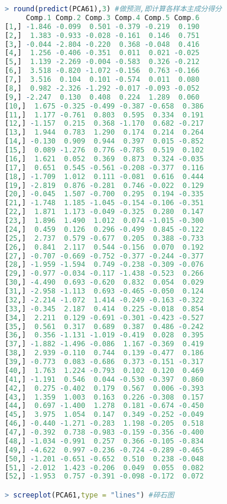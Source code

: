 \documentclass[11pt,a4paper,oneside]{book}
\begin{document}
\begin{lstlisting}[language=r]
> round(predict(PCA61),3) #做预测,即计算各样本主成分得分
     Comp.1 Comp.2 Comp.3 Comp.4 Comp.5 Comp.6
[1,] -1.846 -0.099  0.501 -0.379 -0.219  0.190
[2,]  1.383 -0.933 -0.028 -0.161  0.146  0.751
[3,] -0.044 -2.804 -0.220  0.368 -0.048  0.416
[4,]  1.256 -0.406 -0.351  0.011  0.021 -0.025
[5,]  1.139 -2.269 -0.004 -0.583  0.326 -0.212
[6,]  3.518 -0.820 -1.072 -0.156  0.763 -0.166
[7,]  3.516  0.104  0.101 -0.574  0.011  0.080
[8,]  0.982 -2.326 -1.292 -0.017 -0.093 -0.052
[9,] -2.247  0.130  0.408  0.224  1.289  0.060
[10,]  1.675 -0.325 -0.499 -0.387 -0.658  0.386
[11,]  1.177 -0.761  0.803  0.595  0.334  0.191
[12,] -1.157  0.215  0.368 -1.170  0.682 -0.217
[13,]  1.944  0.783  1.290  0.174  0.214  0.264
[14,] -0.130  0.909  0.944  0.397  0.015 -0.852
[15,]  0.089 -1.276  0.776 -0.785  0.519  0.102
[16,]  1.621  0.052  0.369  0.873  0.324 -0.035
[17,]  0.651  0.545 -0.561 -0.208 -0.377  0.116
[18,] -1.709  1.012  0.111 -0.081  0.616  0.444
[19,] -2.819  0.876 -0.281  0.746 -0.022  0.129
[20,] -0.045  1.507 -0.700  0.295  0.194 -0.335
[21,] -1.748  1.185 -1.045 -0.154 -0.106 -0.351
[22,]  1.871  1.173 -0.049 -0.325  0.280  0.147
[23,]  1.896  1.490  1.012  0.074 -1.015 -0.300
[24,]  0.459  0.126  0.296 -0.499  0.845 -0.122
[25,]  2.737  0.579 -0.677  0.205  0.388 -0.733
[26,]  0.841  2.117  0.544 -0.156  0.070  0.192
[27,] -0.707 -0.669 -0.752 -0.377 -0.244 -0.377
[28,] -1.959 -1.594  0.749 -0.238 -0.309 -0.076
[29,] -0.977 -0.034 -0.117 -1.438 -0.523  0.266
[30,] -4.490  0.693 -0.620  0.832  0.054  0.029
[31,] -2.958 -1.113  0.693 -0.465 -0.050  0.124
[32,] -2.214 -1.072  1.414 -0.249 -0.163 -0.322
[33,] -0.345  2.187  0.414  0.225 -0.018  0.854
[34,]  2.211  0.129 -0.691 -0.301 -0.423 -0.527
[35,]  0.561  0.317  0.689  0.387  0.486 -0.242
[36,]  0.356 -1.131 -1.019 -0.419  0.028  0.395
[37,] -1.882 -1.496 -0.086  1.167 -0.369  0.419
[38,]  2.939 -0.110  0.744  0.139 -0.477  0.186
[39,] -0.773  0.083 -0.686  0.373 -0.151 -0.317
[40,]  1.763  1.224 -0.793  0.102  0.120  0.469
[41,] -1.191  0.546  0.044 -0.530 -0.397  0.860
[42,]  0.275 -0.402  0.179  0.567  0.006 -0.393
[43,]  1.359  1.003  0.163  0.226 -0.308  0.157
[44,]  0.697 -1.400  1.278  0.181 -0.674 -0.450
[45,]  3.975  1.054  0.147  0.349 -0.252 -0.049
[46,] -0.440 -1.271 -0.283  1.198 -0.205  0.518
[47,] -0.392  0.738 -0.983 -0.159 -0.356 -0.400
[48,] -1.034 -0.991  0.257  0.366 -0.105 -0.834
[49,] -4.622  0.997 -0.236 -0.724 -0.289 -0.465
[50,] -1.201 -0.651 -0.652  0.510  0.238 -0.048
[51,] -2.012  1.423 -0.206  0.049  0.055  0.082
[52,] -1.953  0.757 -0.391 -0.098 -0.172  0.072

> screeplot(PCA61,type = "lines") #碎石图

\end{lstlisting}
\end{document}
